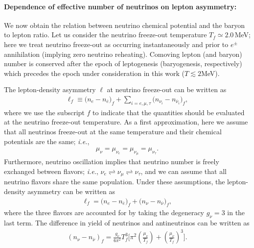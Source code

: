 \paragraph{Dependence of effective number of neutrinos on lepton asymmetry:}
We now obtain the relation between neutrino chemical potential and the baryon to lepton ratio. Let us consider the neutrino freeze-out temperature $T_f\simeq 2.0$\,MeV; here we treat neutrino freeze-out as occurring instantaneously and prior to $e^\pm$ annihilation (implying zero neutrino reheating). Comoving lepton (and baryon) number is conserved after the epoch of leptogenesis (baryogenesis, respectively) which precedes the epoch  under consideration in this work ($T\lesssim 2$\;MeV). %

The lepton-density asymmetry $\ell $ at neutrino freeze-out can be written as
\begin{align}
\ell_f \equiv\big(n_e-n_{\overline{e}}\big)_f+\sum_{i=e,\mu, \tau}\big(n_{\nu_i}-n_{\overline{\nu}_i}\big)_f,
\end{align}
where we use the subscript $f$ to indicate that the quantities should be evaluated at the neutrino freeze-out temperature. As a first approximation, here we assume that all neutrinos freeze-out at the same temperature and their chemical potentials are the same; {\it i.e.\/},
\begin{align}
\mu_\nu=\mu_{\nu_e}=\mu_{\nu_\mu}=\mu_{\nu_\tau}.
\end{align}
Furthermore, neutrino oscillation implies that neutrino number is freely exchanged between flavors; {\it i.e.\/}, $\nu_e\rightleftharpoons\nu_\mu\rightleftharpoons\nu_\tau$, and we can assume that all neutrino flavors share the same population. Under these assumptions, the lepton-density asymmetry can be written as
\begin{align}
\label{L_asymmetry} 
\ell_f=\big(n_e-n_{\overline{e}}\big)_f+\big(n_{\nu}-n_{\overline{\nu}}\big)_f,
\end{align}
where the three flavors are accounted for by taking the degeneracy $g_\nu=3$ in the last term. The difference in yield of neutrinos and antineutrinos can be written as
\begin{align}
\label{Excess_Neutrino}
\left(n_\nu-n_{\overline{\nu}}\right)_f=\frac{g_\nu}{6\pi^2}T^3_f\bigg[\pi^2\left(\frac{\mu_\nu}{T_f}\right)+\left(\frac{\mu_\nu}{T_f}\right)^{\!\!3}\bigg].
\end{align}



